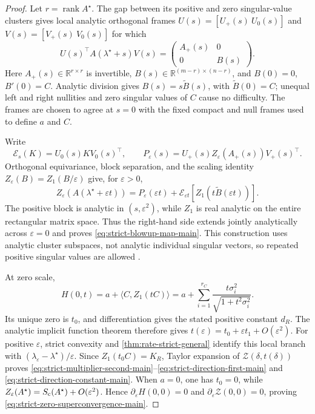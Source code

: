\begin{proof}
Let \(r=\operatorname{rank}A^\star\).  The gap between its positive and zero
singular-value clusters gives local analytic orthogonal frames
\(U(s)=[U_+(s)\ U_0(s)]\) and \(V(s)=[V_+(s)\ V_0(s)]\) for which
\[
 U(s)^\top A(\lambda^\star+s)V(s)
 =\begin{pmatrix}A_+(s)&0\\0&B(s)\end{pmatrix}.
\]
Here \(A_+(s)\in\mathbb R^{r\times r}\) is invertible,
\(B(s)\in\mathbb R^{(m-r)\times(n-r)}\), and
\(B(0)=0\), \(B'(0)=C\).  Analytic division gives
\(B(s)=s\widetilde B(s)\), with \(\widetilde B(0)=C\); unequal left and
right nullities and zero singular values of \(C\) cause no difficulty.
The frames are chosen to agree at \(s=0\) with the fixed compact and null
frames used to define \(a\) and \(C\).

Write
\[
 \mathcal E_s(K)=U_0(s)KV_0(s)^\top,
 \qquad
 P_\varepsilon(s)=
 U_+(s)Z_\varepsilon(A_+(s))V_+(s)^\top.
\]
Orthogonal equivariance, block separation, and the scaling identity
\(Z_\varepsilon(B)=Z_1(B/\varepsilon)\) give, for \(\varepsilon>0\),
\begin{equation}
 Z_\varepsilon(A(\lambda^\star+\varepsilon t))
 =P_\varepsilon(\varepsilon t)
 +\mathcal E_{\varepsilon t}
  \left[Z_1\!\left(t\widetilde B(\varepsilon t)\right)\right].
 \label{eq:strict-blowup-block-main}
\end{equation}
The positive block is analytic in \((s,\varepsilon^2)\), while \(Z_1\) is
real analytic on the entire rectangular matrix space.  Thus the right-hand
side extends jointly analytically across \(\varepsilon=0\) and proves
\eqref{eq:strict-blowup-map-main}.  This construction uses analytic cluster
subspaces, not analytic individual singular vectors, so repeated positive
singular values are allowed \citep[Chapter II]{kato1995perturbation}.

At zero scale,
\[
 H(0,t)=a+\langle C,Z_1(tC)\rangle
 =a+\sum_{i=1}^{r_C}
   \frac{t\sigma_i^2}{\sqrt{1+t^2\sigma_i^2}}.
\]
Its unique zero is \(t_0\), and differentiation gives the stated positive
constant \(d_R\).  The analytic implicit function theorem therefore gives
\(t(\varepsilon)=t_0+\varepsilon t_1+O(\varepsilon^2)\).  For positive
\(\varepsilon\), strict convexity and
\cref{thm:rate-strict-general} identify this local branch with
\((\lambda_\varepsilon-\lambda^\star)/\varepsilon\).
Since \(Z_1(t_0C)=K_R\), Taylor expansion of
\(\mathcal Z(\delta,t(\delta))\) proves
\eqref{eq:strict-multiplier-second-main}--\eqref{eq:strict-direction-first-main}
and \eqref{eq:strict-direction-constant-main}.  When \(a=0\), one has
\(t_0=0\), while
\(Z_\varepsilon(A^\star)=S_{\mathrm c}(A^\star)+O(\varepsilon^2)\).  Hence
\(\partial_\varepsilon H(0,0)=0\) and
\(\partial_\varepsilon\mathcal Z(0,0)=0\), proving
\eqref{eq:strict-zero-superconvergence-main}.
\end{proof}

